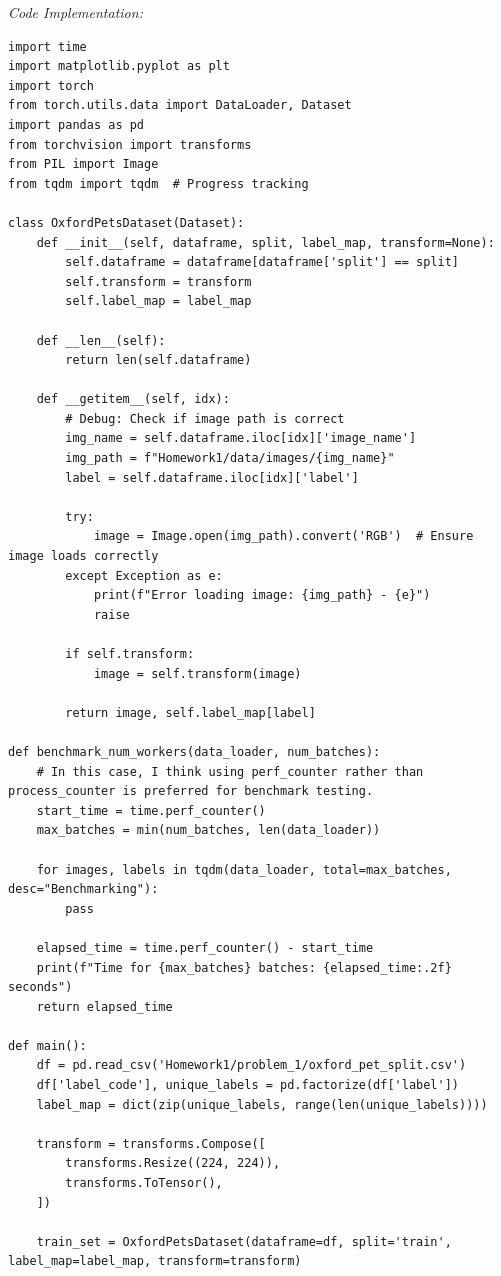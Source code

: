 \documentclass[11pt, oneside]{article}   	%
\begin{document}
\textit{Code Implementation: }
\begin{lstlisting}
import time
import matplotlib.pyplot as plt
import torch
from torch.utils.data import DataLoader, Dataset
import pandas as pd
from torchvision import transforms
from PIL import Image
from tqdm import tqdm  # Progress tracking
    
class OxfordPetsDataset(Dataset):
    def __init__(self, dataframe, split, label_map, transform=None):
        self.dataframe = dataframe[dataframe['split'] == split]
        self.transform = transform
        self.label_map = label_map
    
    def __len__(self):
        return len(self.dataframe)
    
    def __getitem__(self, idx):
        # Debug: Check if image path is correct
        img_name = self.dataframe.iloc[idx]['image_name']
        img_path = f"Homework1/data/images/{img_name}"
        label = self.dataframe.iloc[idx]['label']
    
        try:
            image = Image.open(img_path).convert('RGB')  # Ensure image loads correctly
        except Exception as e:
            print(f"Error loading image: {img_path} - {e}")
            raise
    
        if self.transform:
            image = self.transform(image)
    
        return image, self.label_map[label]
    
def benchmark_num_workers(data_loader, num_batches):
    # In this case, I think using perf_counter rather than process_counter is preferred for benchmark testing.
    start_time = time.perf_counter()
    max_batches = min(num_batches, len(data_loader))
    
    for images, labels in tqdm(data_loader, total=max_batches, desc="Benchmarking"):
        pass  
    
    elapsed_time = time.perf_counter() - start_time
    print(f"Time for {max_batches} batches: {elapsed_time:.2f} seconds")
    return elapsed_time
    
def main():
    df = pd.read_csv('Homework1/problem_1/oxford_pet_split.csv')
    df['label_code'], unique_labels = pd.factorize(df['label'])
    label_map = dict(zip(unique_labels, range(len(unique_labels))))
    
    transform = transforms.Compose([
        transforms.Resize((224, 224)),
        transforms.ToTensor(),
    ])
    
    train_set = OxfordPetsDataset(dataframe=df, split='train', label_map=label_map, transform=transform)
    

\end{lstlisting}
\end{document}
